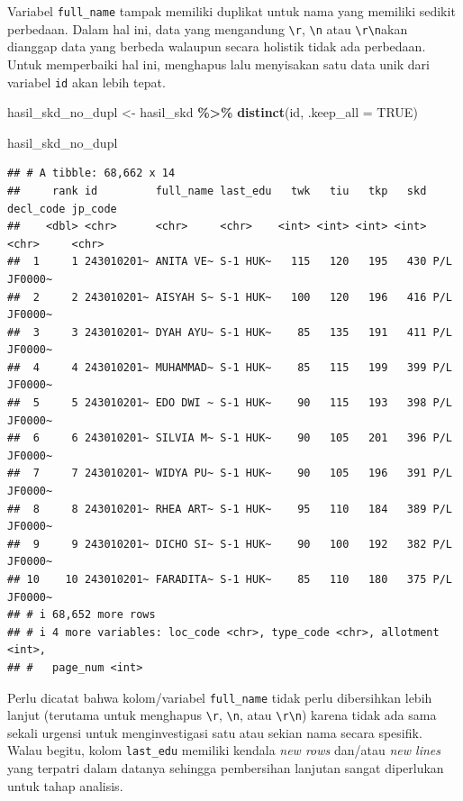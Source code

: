\documentclass[
]{article}
\newenvironment{Shaded}{\begin{snugshade}}{\end{snugshade}}
\newcommand{\AttributeTok}[1]{\textcolor[rgb]{0.13,0.29,0.53}{#1}}
\newcommand{\ConstantTok}[1]{\textcolor[rgb]{0.56,0.35,0.01}{#1}}
\newcommand{\FunctionTok}[1]{\textcolor[rgb]{0.13,0.29,0.53}{\textbf{#1}}}
\newcommand{\NormalTok}[1]{#1}
\newcommand{\OtherTok}[1]{\textcolor[rgb]{0.56,0.35,0.01}{#1}}
\newcommand{\SpecialCharTok}[1]{\textcolor[rgb]{0.81,0.36,0.00}{\textbf{#1}}}
\begin{document}
Variabel \texttt{full\_name} tampak memiliki duplikat untuk nama yang
memiliki sedikit perbedaan. Dalam hal ini, data yang mengandung
\texttt{\textbackslash{}r}, \texttt{\textbackslash{}n} atau
\texttt{\textbackslash{}r\textbackslash{}n}akan dianggap data yang
berbeda walaupun secara holistik tidak ada perbedaan. Untuk memperbaiki
hal ini, menghapus lalu menyisakan satu data unik dari variabel
\texttt{id} akan lebih tepat.

\begin{Shaded}
\begin{Highlighting}[]
\NormalTok{hasil\_skd\_no\_dupl }\OtherTok{\textless{}{-}}\NormalTok{ hasil\_skd }\SpecialCharTok{\%\textgreater{}\%} 
  \FunctionTok{distinct}\NormalTok{(id, }\AttributeTok{.keep\_all =} \ConstantTok{TRUE}\NormalTok{)}

\NormalTok{hasil\_skd\_no\_dupl}
\end{Highlighting}
\end{Shaded}

\begin{verbatim}
## # A tibble: 68,662 x 14
##     rank id         full_name last_edu   twk   tiu   tkp   skd decl_code jp_code
##    <dbl> <chr>      <chr>     <chr>    <int> <int> <int> <int> <chr>     <chr>  
##  1     1 243010201~ ANITA VE~ S-1 HUK~   115   120   195   430 P/L       JF0000~
##  2     2 243010201~ AISYAH S~ S-1 HUK~   100   120   196   416 P/L       JF0000~
##  3     3 243010201~ DYAH AYU~ S-1 HUK~    85   135   191   411 P/L       JF0000~
##  4     4 243010201~ MUHAMMAD~ S-1 HUK~    85   115   199   399 P/L       JF0000~
##  5     5 243010201~ EDO DWI ~ S-1 HUK~    90   115   193   398 P/L       JF0000~
##  6     6 243010201~ SILVIA M~ S-1 HUK~    90   105   201   396 P/L       JF0000~
##  7     7 243010201~ WIDYA PU~ S-1 HUK~    90   105   196   391 P/L       JF0000~
##  8     8 243010201~ RHEA ART~ S-1 HUK~    95   110   184   389 P/L       JF0000~
##  9     9 243010201~ DICHO SI~ S-1 HUK~    90   100   192   382 P/L       JF0000~
## 10    10 243010201~ FARADITA~ S-1 HUK~    85   110   180   375 P/L       JF0000~
## # i 68,652 more rows
## # i 4 more variables: loc_code <chr>, type_code <chr>, allotment <int>,
## #   page_num <int>
\end{verbatim}

Perlu dicatat bahwa kolom/variabel \texttt{full\_name} tidak perlu
dibersihkan lebih lanjut (terutama untuk menghapus
\texttt{\textbackslash{}r}, \texttt{\textbackslash{}n}, atau
\texttt{\textbackslash{}r\textbackslash{}n}) karena tidak ada sama
sekali urgensi untuk menginvestigasi satu atau sekian nama secara
spesifik. Walau begitu, kolom \texttt{last\_edu} memiliki kendala
\emph{new rows} dan/atau \emph{new lines} yang terpatri dalam datanya
sehingga pembersihan lanjutan sangat diperlukan untuk tahap analisis.
\end{document}
